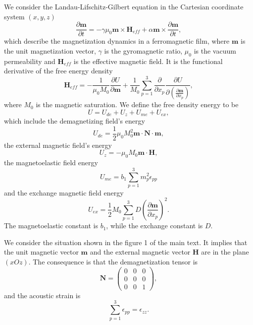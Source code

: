 \documentclass[aps,prl,amsmath,amssymb,preprint,superscriptaddress]{revtex4-1}
\begin{document}
We consider the Landau-Lifschitz-Gilbert equation in the Cartesian coordinate system $\left(x,y,z\right)$
\begin{equation}
    \frac{\partial \mathbf{m}}{\partial t} = - \gamma \mu_0 \mathbf{m} \times \mathbf{H}_{eff} + \alpha \mathbf{m} \times \frac{\partial \mathbf{m}}{\partial t},
    \label{eq:LLG-1}
\end{equation}
which describe the magnetization dynamics in a ferromagnetic film, where $\mathbf{m}$ is the unit magnetization vector, $\gamma$ is the gyromagnetic ratio, $\mu_0$ is the vacuum permeability and $\mathbf{H}_{eff}$ is the effective magnetic field.
It is the functional derivative of the free energy density
\begin{equation}
    \mathbf{H}_{eff} = - \frac{1}{\mu_0 M_0} \frac{\partial U}{\partial \mathbf{m}} + \frac{1}{M_0} \sum_{p=1}^{3} \frac{\partial}{\partial x_p} \frac{\partial U}{\partial \left(\frac{\partial  \mathbf{m}}{\partial x_p} \right)},
    \label{eq:Heff}
\end{equation}
where $M_0$ is the magnetic saturation.
We define the free density energy to be 
\begin{equation}
    U = U_{de} + U_{z} + U_{me} + U_{ex},
    \label{eq:U}
\end{equation}
which include the demagnetizing field's energy
\begin{equation}
    U_{de} = \frac{1}{2} \mu_0 M_0^2 \mathbf{m} \cdot \mathbf{N} \cdot \mathbf{m},
    \label{eq:Ude}
\end{equation}
the external magnetic field's energy
\begin{equation}
    U_z = -\mu_0 M_0 \mathbf{m} \cdot \mathbf{H},
    \label{eq:Uz}
\end{equation}
the magnetoelastic field energy
\begin{equation}
    U_{me} = b_1 \sum_{p=1}^3 m_p^2\epsilon_{pp}
    \label{eq:Ume}
\end{equation}
and the exchange magnetic field energy
\begin{equation}
    U_{ex} = \frac{1}{2} M_0 \sum_{p=1}^3 D \left( \frac{\partial \mathbf{m}}{\partial x_p} \right)^2.
    \label{eq:Uex}
\end{equation}
The magnetoelastic constant is $b_1$, while the exchange constant is $D$.

We consider the situation shown in the figure 1 of the main text.
It implies that the unit magnetic vector $\mathbf{m}$ and the external magnetic vector $\mathbf{H}$ are in the plane $\left(x O z\right)$.
The consequence is that the demagnetization tensor is
\begin{equation}
    \mathbf{N} = \begin{pmatrix} 0 & 0 & 0 \\
    0 & 0 & 0 \\
    0 & 0 & 1
    \end{pmatrix},
    \label{eq:N}
\end{equation}
and the acoustic strain is
\begin{equation}
    \sum_{p=1}^3\epsilon_{pp} = \epsilon_{zz}.
    \label{eq:epsilon}
\end{equation}
\end{document}

